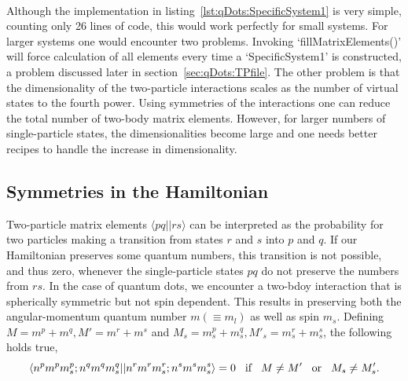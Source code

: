 \paragraph*{}
Although the implementation in listing~\ref{lst:qDots:SpecificSystem1} is very simple, counting only 26 lines of code, this would work perfectly for small systems.
For larger systems one would encounter two problems.
Invoking `fillMatrixElements()' will force calculation of all elements every time a `SpecificSystem1' is constructed, a problem discussed later in section~\ref{sec:qDots:TPfile}.
The other problem is that the dimensionality of the two-particle interactions scales as the number of virtual states to the fourth power. Using symmetries of the interactions one can  reduce the total number of two-body matrix elements. However, for larger numbers of single-particle states, the dimensionalities become large and one 
needs better recipes to handle the increase in dimensionality.


\subsection{Symmetries in the Hamiltonian}
\label{sec:qDots:symHam}
Two-particle matrix elements $\langle pq||rs \rangle$ can be interpreted as the probability for two particles making a transition from states $r$ and $s$ into $p$ and $q$.
If our Hamiltonian preserves some quantum numbers, this transition is not possible, and thus zero, whenever the single-particle states $pq$ do not preserve the numbers from $rs$.
In the case of quantum dots, we encounter a two-bdoy interaction that is spherically symmetric but not spin dependent.
This results in preserving both the angular-momentum quantum number $m (\equiv m_l)$ as well as spin $m_s$.
Defining $M =m^p + m^q, M' = m^r + m^s$ and $M_s = m_s^p + m_s^q, M'_s = m_s^r + m_s^s$, the following holds true,
\begin{equation}
\langle n^p m^p m_s^p; n^q m^q m_s^q || n^r m^r m_s^r; n^s m^s m_s^s \rangle
= 
0
\hspace{3mm}\textrm{if}\hspace{3mm}
M \neq M'
\hspace{3mm}\textrm{or}\hspace{3mm}
M_s \neq M'_s .
\end{equation}

